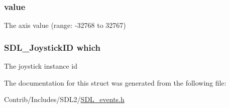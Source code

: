 \subsubsection[{\texorpdfstring{value}{value}}]{ value}\hypertarget{struct_s_d_l___joy_axis_event_ae36d960bffe70dcf148258f6dbcb0ef8}{}\label{struct_s_d_l___joy_axis_event_ae36d960bffe70dcf148258f6dbcb0ef8}
The axis value (range\+: -\/32768 to 32767) 
\subsubsection[{\texorpdfstring{which}{which}}]{\setlength{\rightskip}{0pt plus 5cm}S\+D\+L\+\_\+\+Joystick\+ID which}\hypertarget{struct_s_d_l___joy_axis_event_a911f8b28e26cf5ad3e985e76d4987014}{}\label{struct_s_d_l___joy_axis_event_a911f8b28e26cf5ad3e985e76d4987014}
The joystick instance id 

The documentation for this struct was generated from the following file\+:\begin{DoxyCompactItemize}
\item 
Contrib/\+Includes/\+S\+D\+L2/\hyperlink{_s_d_l__events_8h}{S\+D\+L\+\_\+events.\+h}\end{DoxyCompactItemize}
